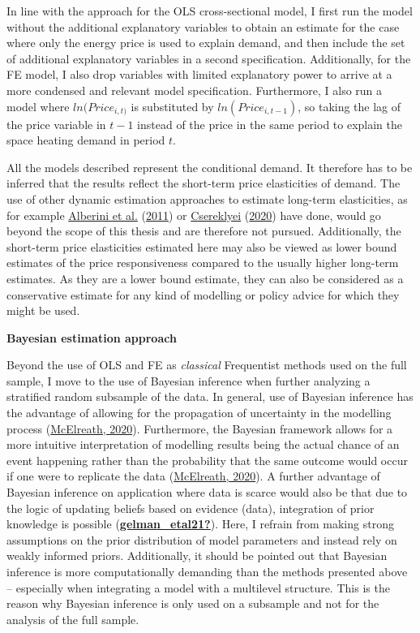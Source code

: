 \documentclass[12pt,twoside]{reedthesis}
\begin{document}
In line with the approach for the OLS cross-sectional model, I first run the model without the additional explanatory variables to obtain an estimate for the case where only the energy price is used to explain demand, and then include the set of additional explanatory variables in a second specification. Additionally, for the FE model, I also drop variables with limited explanatory power to arrive at a more condensed and relevant model specification. Furthermore, I also run a model where \(ln(Price_{i,t)}\) is substituted by \(ln(Price_{i,t-1})\), so taking the lag of the price variable in \(t-1\) instead of the price in the same period to explain the space heating demand in period \(t\).

All the models described represent the conditional demand. It therefore has to be inferred that the results reflect the short-term price elasticities of demand. The use of other dynamic estimation approaches to estimate long-term elasticities, as for example \protect\hyperlink{ref-alberini_etal11}{Alberini et al.} (\protect\hyperlink{ref-alberini_etal11}{2011}) or \protect\hyperlink{ref-csereklyei20}{Csereklyei} (\protect\hyperlink{ref-csereklyei20}{2020}) have done, would go beyond the scope of this thesis and are therefore not pursued. Additionally, the short-term price elasticities estimated here may also be viewed as lower bound estimates of the price responsiveness compared to the usually higher long-term estimates. As they are a lower bound estimate, they can also be considered as a conservative estimate for any kind of modelling or policy advice for which they might be used.

\textbf{Bayesian estimation approach}

Beyond the use of OLS and FE as \emph{classical} Frequentist methods used on the full sample, I move to the use of Bayesian inference when further analyzing a stratified random subsample of the data. In general, use of Bayesian inference has the advantage of allowing for the propagation of uncertainty in the modelling process (\protect\hyperlink{ref-mcelreath20}{McElreath, 2020}). Furthermore, the Bayesian framework allows for a more intuitive interpretation of modelling results being the actual chance of an event happening rather than the probability that the same outcome would occur if one were to replicate the data (\protect\hyperlink{ref-mcelreath20}{McElreath, 2020}). A further advantage of Bayesian inference on application where data is scarce would also be that due to the logic of updating beliefs based on evidence (data), integration of prior knowledge is possible (\protect\hyperlink{ref-gelman_etal21}{\textbf{gelman\_etal21?}}). Here, I refrain from making strong assumptions on the prior distribution of model parameters and instead rely on weakly informed priors. Additionally, it should be pointed out that Bayesian inference is more computationally demanding than the methods presented above -- especially when integrating a model with a multilevel structure. This is the reason why Bayesian inference is only used on a subsample and not for the analysis of the full sample.
\end{document}
